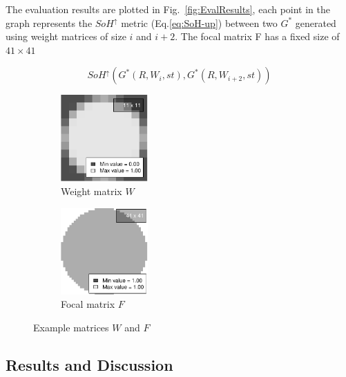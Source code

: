 \documentclass{itatnew}
\begin{document}
The evaluation results are plotted in Fig.~\ref{fig:EvalResults}, each point in
the graph represents the $SoH^\uparrow$ metric (Eq.\ref{eq:SoH-up}) between two
$G^*$ generated using weight matrices of size $i$ and $i+2$. The focal matrix F
has a fixed size of $41{\times}41$

\begin{displaymath}
SoH^\uparrow( G^*(R, W_i, st), G^*(R, W_{i+2}, st) )
\end{displaymath}

\begin{figure}[htp]
  \centering
  \begin{subfigure}{.45\columnwidth}
    \centering
    \caption{Weight matrix $W$}
    \includegraphics[width=9em]{images/hotspot-weight-matrix-1}
  \end{subfigure}
  \begin{subfigure}{.45\columnwidth}
    \centering
    \caption{Focal matrix $F$}
    \includegraphics[width=9em]{images/hotspot-eval-gstar-focus-matrix-1}
  \end{subfigure}
  \caption{Example matrices $W$ and $F$}
  \label{fig:ExampleMatrices}
\end{figure}

\subsection{Results and Discussion}
\end{document}
